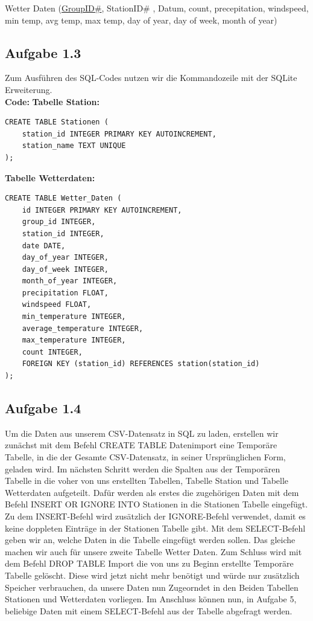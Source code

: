 \documentclass[a4paper, 12pt]{article}
\begin{document}
Wetter Daten (\underline{GroupID\#}, StationID\# , Datum, count, precepitation, windspeed, min temp, avg temp, max temp, day of year, day of week, month of year)

\subsection{Aufgabe 1.3}
Zum Ausführen des SQL-Codes nutzen wir die Kommandozeile mit der SQLite Erweiterung.
\\

\textbf{Code:} \newline
\textbf{Tabelle Station:}
\begin{verbatim}
CREATE TABLE Stationen ( 
    station_id INTEGER PRIMARY KEY AUTOINCREMENT,
    station_name TEXT UNIQUE 
);
\end{verbatim}

\textbf{Tabelle Wetterdaten:}
\begin{verbatim}
CREATE TABLE Wetter_Daten (
    id INTEGER PRIMARY KEY AUTOINCREMENT,
    group_id INTEGER,
    station_id INTEGER,
    date DATE,
    day_of_year INTEGER,
    day_of_week INTEGER,
    month_of_year INTEGER,
    precipitation FLOAT,
    windspeed FLOAT,
    min_temperature INTEGER,
    average_temperature INTEGER,
    max_temperature INTEGER,
    count INTEGER,
    FOREIGN KEY (station_id) REFERENCES station(station_id)
);    
\end{verbatim}



\newpage
\subsection{Aufgabe 1.4}
Um die Daten aus unserem CSV-Datensatz in SQL zu laden, erstellen wir zunächst mit dem Befehl CREATE TABLE Datenimport eine Temporäre Tabelle, in die der Gesamte CSV-Datensatz, in seiner Ursprünglichen Form, geladen wird. Im nächsten Schritt werden die Spalten aus der Temporären Tabelle in  die voher von uns erstellten Tabellen, Tabelle Station und Tabelle Wetterdaten aufgeteilt. Dafür werden als erstes die zugehörigen Daten mit dem Befehl INSERT OR IGNORE INTO Stationen in die Stationen Tabelle eingefügt. Zu dem INSERT-Befehl wird zusätzlich der IGNORE-Befehl verwendet, damit es keine doppleten Einträge in der Stationen Tabelle gibt. Mit dem SELECT-Befehl geben wir an, welche Daten in die Tabelle eingefügt werden sollen. Das gleiche machen wir auch für unsere zweite Tabelle Wetter Daten. Zum Schluss wird mit dem Befehl DROP TABLE Import die von uns zu Beginn erstellte Temporäre Tabelle gelöscht. Diese wird jetzt nicht mehr benötigt und würde nur zusätzlich Speicher verbrauchen, da unsere Daten nun Zugeorndet in den Beiden Tabellen Stationen und Wetterdaten vorliegen. Im Anschluss können nun, in Aufgabe 5, beliebige Daten mit einem SELECT-Befehl aus der Tabelle abgefragt werden.
\end{document}
